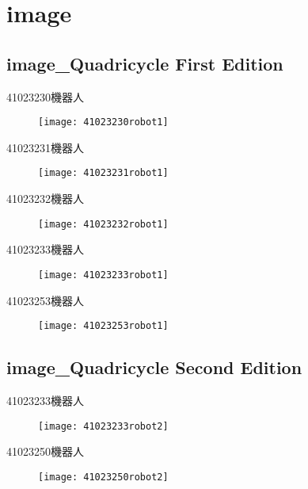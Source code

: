 ﻿\chapter{image}



\section{image\_Quadricycle First Edition}
41023230機器人\\
\begin{figure}
\texttt{[image: 41023230robot1]}
\end{figure}
41023231機器人\\
\begin{figure}
\texttt{[image: 41023231robot1]}
\end{figure}
41023232機器人\\
\begin{figure}
\texttt{[image: 41023232robot1]}
\end{figure}
41023233機器人\\
\begin{figure}
\texttt{[image: 41023233robot1]}
\end{figure}
41023253機器人\\
\begin{figure}
\texttt{[image: 41023253robot1]}
\end{figure}
\section{image\_Quadricycle Second Edition}
41023233機器人\\
\begin{figure}
\texttt{[image: 41023233robot2]}
\end{figure}
41023250機器人\\
\begin{figure}
\texttt{[image: 41023250robot2]}
\end{figure}
